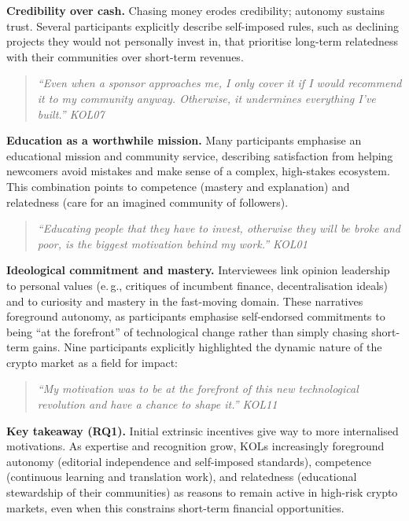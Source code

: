 \noindent\textbf{Credibility over cash.} Chasing money erodes credibility; autonomy sustains trust. Several participants explicitly describe self-imposed rules, such as declining projects they would not personally invest in, that prioritise long-term relatedness with their communities over short-term revenues.

\begin{quote}\itshape
``Even when a sponsor approaches me, I only cover it if I would recommend it to my community anyway. Otherwise, it undermines everything I've built.'' \textemdash{} KOL07
\end{quote}

\noindent\textbf{Education as a worthwhile mission.} Many participants emphasise an educational mission and community service, describing satisfaction from helping newcomers avoid mistakes and make sense of a complex, high-stakes ecosystem. This combination points to competence (mastery and explanation) and relatedness (care for an imagined community of followers).

\begin{quote}\itshape
``Educating people that they have to invest, otherwise they will be broke and poor, is the biggest motivation behind my work.'' \textemdash{} KOL01
\end{quote}

\noindent\textbf{Ideological commitment and mastery.} Interviewees link opinion leadership to personal values (e.\,g., critiques of incumbent finance, decentralisation ideals) and to curiosity and mastery in the fast-moving domain. These narratives foreground autonomy, as participants emphasise self-endorsed commitments to being ``at the forefront'' of technological change rather than simply chasing short-term gains.
Nine participants explicitly highlighted the dynamic nature of the crypto market as a field for impact:
\begin{quote}\itshape
``My motivation was to be at the forefront of this new technological revolution and have a chance to shape it.''
\textemdash{} KOL11
\end{quote}


\noindent\textbf{Key takeaway (RQ1).} Initial extrinsic incentives give way to more internalised motivations. As expertise and recognition grow, KOLs increasingly foreground autonomy (editorial independence and self-imposed standards), competence (continuous learning and translation work), and relatedness (educational stewardship of their communities) as reasons to remain active in high-risk crypto markets, even when this constrains short-term financial opportunities.

